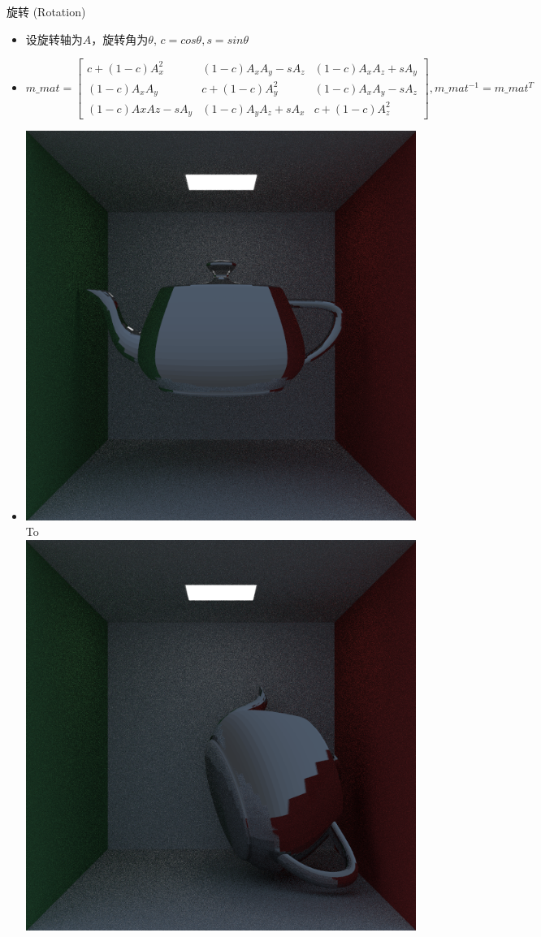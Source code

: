 \documentclass{beamer}
\begin{document}
\begin{frame} {旋转 (Rotation)}
\begin{itemize}
\item 设旋转轴为$A$，旋转角为$\theta$, $c = cos\theta, s = sin\theta$
\item \tiny $m\_mat = \begin{bmatrix} c+(1-c)A_x^2&(1-c)A_xA_y-sA_z&(1-c)A_xA_z+sA_y\\ (1-c)A_xA_y&c+(1-c)A_y^2&(1-c)A_xA_y-sA_z\\ (1-c)AxAz-sA_y&(1-c)A_yA_z+sA_x&c+(1-c)A_z^2 \end{bmatrix} ,m\_mat^{-1} = m\_mat^T$
\item \includegraphics[scale=0.2]{cornellbox_teapot_translate} \normalsize To 
\includegraphics[scale=0.2]{cornellbox_teapot_rotate}

\end{itemize}
\end{frame}
\end{document}
